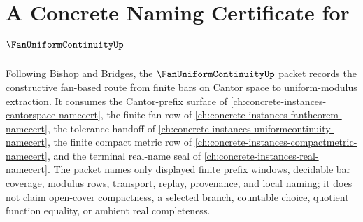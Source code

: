 \chapter{A Concrete Naming Certificate for $\FanUniformContinuityUp$}
\label{ch:concrete-instances-fan-uniform-continuity-namecert}

Following Bishop and Bridges, the $\FanUniformContinuityUp$ packet records the constructive fan-based route from finite bars on Cantor space to uniform-modulus extraction. It consumes the Cantor-prefix surface of \autoref{ch:concrete-instances-cantorspace-namecert}, the finite fan row of \autoref{ch:concrete-instances-fantheorem-namecert}, the tolerance handoff of \autoref{ch:concrete-instances-uniformcontinuity-namecert}, the finite compact metric row of \autoref{ch:concrete-instances-compactmetric-namecert}, and the terminal real-name seal of \autoref{ch:concrete-instances-real-namecert}. The packet names only displayed finite prefix windows, decidable bar coverage, modulus rows, transport, replay, provenance, and local naming; it does not claim open-cover compactness, a selected branch, countable choice, quotient function equality, or ambient real completeness.

